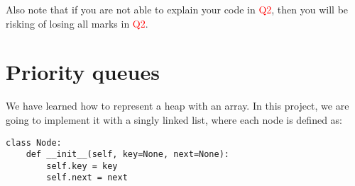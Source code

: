 \documentclass{article}
\begin{document}
Also note that if you are not able to explain your code in \textcolor{red}{Q2}, then you will be risking of losing all marks in \textcolor{red}{Q2}.

\section{Priority queues}
We have learned how to represent a heap with an array. In this project, we are going to implement it with a singly linked list, where each node is defined as:

\begin{verbatim}
class Node:
    def __init__(self, key=None, next=None):
        self.key = key
        self.next = next
\end{verbatim}

\lipsum
\end{document}
